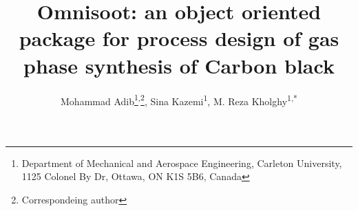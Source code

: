 	\title{\renewcommand\baselinestretch{1}\bf
		Omnisoot: an object oriented package for process design of gas phase synthesis of Carbon black
		}
	\renewcommand\baselinestretch{0.8}
	\author{
	Mohammad Adib{\vspace{0.4em}}\footnote{\scriptsize{Department of Mechanical and Aerospace Engineering, Carleton University, 1125 Colonel By Dr, Ottawa, ON K1S 5B6, Canada}}{\hspace{0.3em}}\textsuperscript{,}{\hspace{0.01em}}\footnote{\scriptsize{Correspondeing author}},
	Sina Kazemi\textsuperscript{1}{\vspace{0.4em}},  
	M. Reza Kholghy\textsuperscript{1,*} 
}
	\date{}
	\maketitle
	\renewcommand\baselinestretch{1.3}
	
